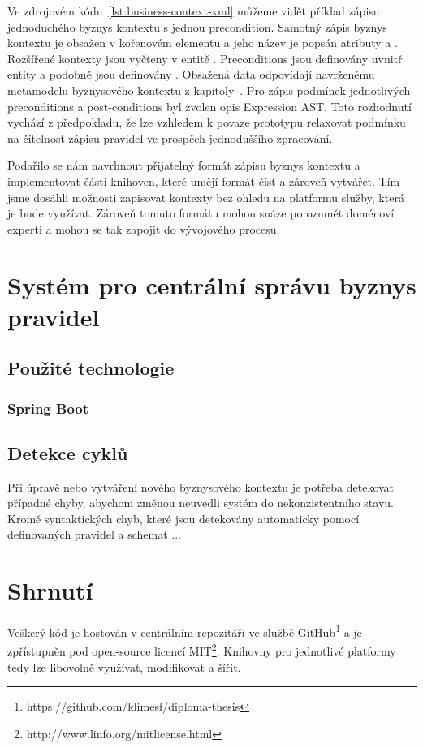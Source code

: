 Ve zdrojovém kódu~\ref{lst:business-context-xml} můžeme vidět
příklad zápisu jednoduchého byznys kontextu s jednou precondition.
Samotný zápis byznys kontextu je obsažen v kořenovém elementu
 a jeho název je popsán atributy
 a . Rozšířené kontexty jsou vyčteny
v entitě . Preconditions jsou
definovány uvnitř entity  a podobně
jsou definovány . Obsažená data odpovídají
navrženému metamodelu byznysového kontextu z kapitoly~.
Pro zápis podmínek jednotlivých preconditions a post-conditions byl zvolen
opis Expression AST. Toto rozhodnutí vychází z předpokladu,
že lze vzhledem k povaze prototypu relaxovat podmínku
na čitelnost zápisu pravidel ve prospěch jednoduššího zpracování.

Podařilo se nám navrhnout přijatelný formát zápisu byznys kontextu
a implementovat části knihoven, které umějí formát číst a zároveň vytvářet.
Tím jsme dosáhli možnosti zapisovat kontexty bez ohledu na platformu
služby, která je bude využívat. Zároveň tomuto formátu mohou
snáze porozumět doménoví experti a mohou se tak zapojit do
vývojového procesu.



\section{Systém pro centrální správu byznys pravidel}

\subsection{Použité technologie}

\subsubsection{Spring Boot}

\subsection{Detekce cyklů}

Při úpravě nebo vytváření nového byznysového kontextu je
potřeba detekovat případné chyby, abychom změnou neuvedli
systém do nekonzistentního stavu. Kromě syntaktických chyb,
které jsou detekovány automaticky pomocí definovaných pravidel
a schemat ... %

\section{Shrnutí}

Veškerý kód je hostován v centrálním repozitáři
ve službě GitHub\footnote{
https://github.com/klimesf/diploma-thesis
} a je zpřístupněn pod open-source licencí MIT\footnote{
http://www.linfo.org/mitlicense.html
}. Knihovny pro jednotlivé platformy tedy lze libovolně
využívat, modifikovat a šířit.
